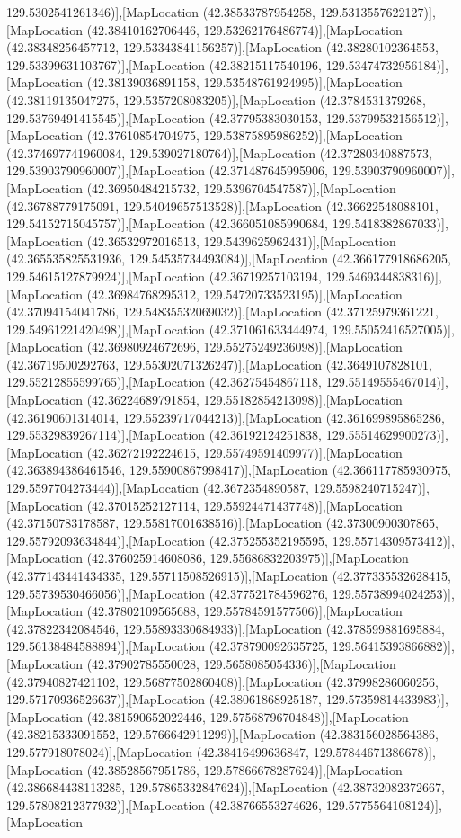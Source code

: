 129.5302541261346)],[MapLocation (42.38533787954258, 129.5313557622127)],[MapLocation (42.38410162706446, 129.53262176486774)],[MapLocation (42.38348256457712, 129.53343841156257)],[MapLocation (42.38280102364553, 129.53399631103767)],[MapLocation (42.38215117540196, 129.53474732956184)],[MapLocation (42.38139036891158, 129.53548761924995)],[MapLocation (42.38119135047275, 129.5357208083205)],[MapLocation (42.3784531379268, 129.53769491415545)],[MapLocation (42.37795383030153, 129.53799532156512)],[MapLocation (42.37610854704975, 129.53875895986252)],[MapLocation (42.374697741960084, 129.539027180764)],[MapLocation (42.37280340887573, 129.53903790960007)],[MapLocation (42.371487645995906, 129.53903790960007)],[MapLocation (42.36950484215732, 129.5396704547587)],[MapLocation (42.36788779175091, 129.54049657513528)],[MapLocation (42.36622548088101, 129.54152715045757)],[MapLocation (42.366051085990684, 129.5418382867033)],[MapLocation (42.36532972016513, 129.5439625962431)],[MapLocation (42.365535825531936, 129.54535734493084)],[MapLocation (42.366177918686205, 129.54615127879924)],[MapLocation (42.36719257103194, 129.5469344838316)],[MapLocation (42.36984768295312, 129.54720733523195)],[MapLocation (42.37094154041786, 129.54835532069032)],[MapLocation (42.37125979361221, 129.54961221420498)],[MapLocation (42.371061633444974, 129.55052416527005)],[MapLocation (42.36980924672696, 129.55275249236098)],[MapLocation (42.36719500292763, 129.55302071326247)],[MapLocation (42.3649107828101, 129.55212855599765)],[MapLocation (42.36275454867118, 129.55149555467014)],[MapLocation (42.36224689791854, 129.55182854213098)],[MapLocation (42.36190601314014, 129.55239717044213)],[MapLocation (42.361699895865286, 129.55329839267114)],[MapLocation (42.36192124251838, 129.55514629900273)],[MapLocation (42.36272192224615, 129.55749591409977)],[MapLocation (42.363894386461546, 129.55900867998417)],[MapLocation (42.366117785930975, 129.5597704273444)],[MapLocation (42.3672354890587, 129.5598240715247)],[MapLocation (42.37015252127114, 129.55924471437748)],[MapLocation (42.37150783178587, 129.55817001638516)],[MapLocation (42.37300900307865, 129.55792093634844)],[MapLocation (42.375255352195595, 129.55714309573412)],[MapLocation (42.376025914608086, 129.55686832203975)],[MapLocation (42.377143441434335, 129.55711508526915)],[MapLocation (42.377335532628415, 129.55739530466056)],[MapLocation (42.377521784596276, 129.55738994024253)],[MapLocation (42.37802109565688, 129.55784591577506)],[MapLocation (42.37822342084546, 129.55893330684933)],[MapLocation (42.378599881695884, 129.56138484588894)],[MapLocation (42.378790092635725, 129.56415393866882)],[MapLocation (42.37902785550028, 129.5658085054336)],[MapLocation (42.37940827421102, 129.56877502860408)],[MapLocation (42.37998286060256, 129.57170936526637)],[MapLocation (42.38061868925187, 129.57359814433983)],[MapLocation (42.381590652022446, 129.57568796704848)],[MapLocation (42.38215333091552, 129.5766642911299)],[MapLocation (42.383156028564386, 129.577918078024)],[MapLocation (42.38416499636847, 129.57844671386678)],[MapLocation (42.38528567951786, 129.57866678287624)],[MapLocation (42.386684438113285, 129.57865332847624)],[MapLocation (42.38732082372667, 129.57808212377932)],[MapLocation (42.38766553274626, 129.5775564108124)],[MapLocation 